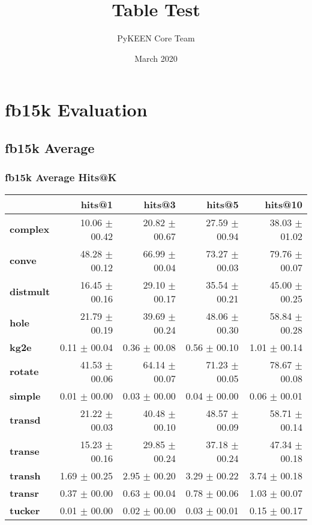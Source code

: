 \documentclass{article}
\title{Table Test}
\author{PyKEEN Core Team}
\date{March 2020}
\begin{document}
\section{fb15k Evaluation}
\subsection{fb15k Average}
\subsubsection{fb15k Average Hits@K}
    \begin{center}
    \begin{tabular}{lrrrr}
\toprule
{} &         hits@1 &         hits@3 &         hits@5 &        hits@10 \\
\midrule
\textbf{complex } &  10.06 $\pm$ 00.42 &  20.82 $\pm$ 00.67 &  27.59 $\pm$ 00.94 &  38.03 $\pm$ 01.02 \\
\textbf{conve   } &  48.28 $\pm$ 00.12 &  66.99 $\pm$ 00.04 &  73.27 $\pm$ 00.03 &  79.76 $\pm$ 00.07 \\
\textbf{distmult} &  16.45 $\pm$ 00.16 &  29.10 $\pm$ 00.17 &  35.54 $\pm$ 00.21 &  45.00 $\pm$ 00.25 \\
\textbf{hole    } &  21.79 $\pm$ 00.19 &  39.69 $\pm$ 00.24 &  48.06 $\pm$ 00.30 &  58.84 $\pm$ 00.28 \\
\textbf{kg2e    } &   0.11 $\pm$ 00.04 &   0.36 $\pm$ 00.08 &   0.56 $\pm$ 00.10 &   1.01 $\pm$ 00.14 \\
\textbf{rotate  } &  41.53 $\pm$ 00.06 &  64.14 $\pm$ 00.07 &  71.23 $\pm$ 00.05 &  78.67 $\pm$ 00.08 \\
\textbf{simple  } &   0.01 $\pm$ 00.00 &   0.03 $\pm$ 00.00 &   0.04 $\pm$ 00.00 &   0.06 $\pm$ 00.01 \\
\textbf{transd  } &  21.22 $\pm$ 00.03 &  40.48 $\pm$ 00.10 &  48.57 $\pm$ 00.09 &  58.71 $\pm$ 00.14 \\
\textbf{transe  } &  15.23 $\pm$ 00.16 &  29.85 $\pm$ 00.24 &  37.18 $\pm$ 00.24 &  47.34 $\pm$ 00.18 \\
\textbf{transh  } &   1.69 $\pm$ 00.25 &   2.95 $\pm$ 00.20 &   3.29 $\pm$ 00.22 &   3.74 $\pm$ 00.18 \\
\textbf{transr  } &   0.37 $\pm$ 00.00 &   0.63 $\pm$ 00.04 &   0.78 $\pm$ 00.06 &   1.03 $\pm$ 00.07 \\
\textbf{tucker  } &   0.01 $\pm$ 00.00 &   0.02 $\pm$ 00.00 &   0.03 $\pm$ 00.01 &   0.15 $\pm$ 00.17 \\
\bottomrule
\end{tabular}

    \end{center}
\end{document}
